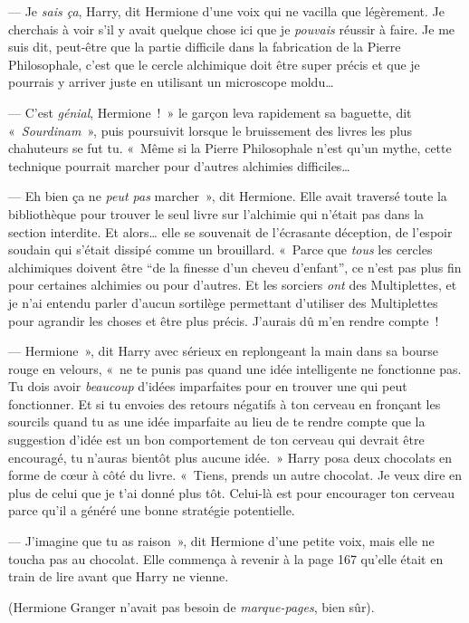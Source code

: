 --- Je \emph{sais ça}, Harry, dit Hermione d'une voix qui ne vacilla que légèrement.
Je cherchais à voir s'il y avait quelque chose ici que je \emph{pouvais} réussir à faire.
Je me suis dit, peut-être que la partie difficile dans la fabrication de la Pierre Philosophale, c'est que le cercle alchimique doit être super précis et que je pourrais y arriver juste en utilisant un microscope moldu…

--- C'est \emph{génial}, Hermione~!~»
le garçon leva rapidement sa baguette, dit «~\emph{Sourdinam}~», puis poursuivit lorsque le bruissement des livres les plus chahuteurs se fut tu.
«~Même si la Pierre Philosophale n'est qu'un mythe, cette technique pourrait marcher pour d'autres alchimies difficiles…

--- Eh bien ça ne \emph{peut pas} marcher~», dit Hermione.
Elle avait traversé toute la bibliothèque pour trouver le seul livre sur l'alchimie qui n'était pas dans la section interdite.
Et alors… elle se souvenait de l'écrasante déception, de l'espoir soudain qui s'était dissipé comme un brouillard.
«~Parce que \emph{tous} les cercles alchimiques doivent être “de la finesse d'un cheveu d'enfant”, ce n'est pas plus fin pour certaines alchimies ou pour d'autres.
Et les sorciers \emph{ont} des Multiplettes, et je n'ai entendu parler d'aucun sortilège permettant d'utiliser des Multiplettes pour agrandir les choses et être plus précis.
J'aurais dû m'en rendre compte~!

--- Hermione~», dit Harry avec sérieux en replongeant la main dans sa bourse rouge en velours, «~ne te punis pas quand une idée intelligente ne fonctionne pas.
Tu dois avoir \emph{beaucoup} d'idées imparfaites pour en trouver une qui peut fonctionner.
Et si tu envoies des retours négatifs à ton cerveau en fronçant les sourcils quand tu as une idée imparfaite au lieu de te rendre compte que la suggestion d'idée est un bon comportement de ton cerveau qui devrait être encouragé, tu n'auras bientôt plus aucune idée.~»
Harry posa deux chocolats en forme de cœur à côté du livre.
«~Tiens, prends un autre chocolat.
Je veux dire en plus de celui que je t'ai donné plus tôt.
Celui-là est pour encourager ton cerveau parce qu'il a généré une bonne stratégie potentielle.

--- J'imagine que tu as raison~», dit Hermione d'une petite voix, mais elle ne toucha pas au chocolat.
Elle commença à revenir à la page 167 qu'elle était en train de lire avant que Harry ne vienne.

(Hermione Granger n'avait pas besoin de \emph{marque-pages}, bien sûr).

